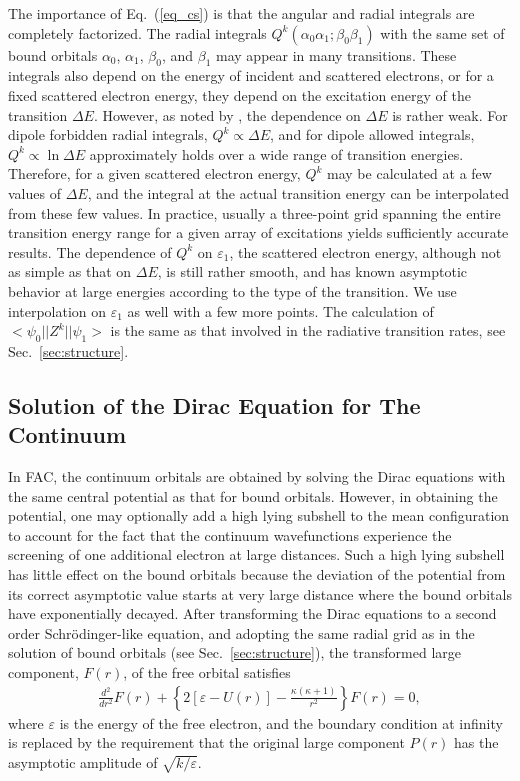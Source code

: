 The importance of Eq.~(\ref{eq_cs}) is that the angular and radial integrals
are completely factorized. The radial integrals
$Q^k(\alpha_0\alpha_1;\beta_0\beta_1)$ with the same set of bound orbitals
$\alpha_0$, $\alpha_1$, $\beta_0$, and $\beta_1$ may appear in many
transitions. These integrals also depend on the energy of incident
and scattered electrons, or for a fixed scattered electron energy, they depend
on the excitation energy of the transition $\Delta E$. However, as noted by
\citet{barshalom:1988a}, the dependence on $\Delta E$  is rather weak. For
dipole forbidden radial integrals, $Q^k \propto \Delta E$, and for dipole
allowed integrals, $Q^k \propto \ln\Delta E$ approximately holds over a wide
range of transition energies. Therefore, for a given scattered electron energy,
$Q^k$ may be calculated at a few values of $\Delta E$, and the integral at the
actual transition energy can be interpolated from these few values. In
practice, 
usually a three-point grid spanning the entire transition energy range for
a given array of excitations yields sufficiently accurate results. The
dependence of $Q^k$ on $\varepsilon_1$, the scattered electron energy,
although not as simple as that on $\Delta E$, is still rather smooth, and has
known asymptotic behavior at large energies according to the type of the
transition. We use interpolation on $\varepsilon_1$ as well with a few more
points. The calculation of $<\psi_0||Z^k||\psi_1>$ is the same as that
involved in the radiative transition rates, see Sec.~\ref{sec:structure}.

\subsection{Solution of the Dirac Equation for The Continuum}
In FAC, the continuum orbitals are obtained by solving the Dirac equations with
the same central potential as that for bound orbitals. However, in obtaining the
potential, one may optionally add a high lying subshell to the mean
configuration to account for the fact that the continuum  wavefunctions
experience the screening of one additional electron at large distances. Such a
high  lying subshell has little effect on the bound orbitals because the
deviation of the potential from its correct asymptotic value starts at very
large distance where the bound orbitals have exponentially decayed.  After
transforming the Dirac equations to a second order Schr\"{o}dinger-like
equation, and adopting the same radial grid as in the solution of bound orbitals
(see Sec.~\ref{sec:structure}), the transformed large component, $F(r)$,  of the
free orbital satisfies 
\begin{eqnarray}
\label{eq_schrodinger2}
\frac{d^2}{d r^2}F(r) + \left\{2\left[\varepsilon-U(r)\right] - 
\frac{\kappa(\kappa + 1)}{r^2}\right\}F(r) = 0,
\end{eqnarray}
where $\varepsilon$ is the energy of the free electron, and the boundary
condition at infinity is replaced by the requirement that the
original large component $P(r)$  has the asymptotic amplitude of
$\sqrt{k/\varepsilon}$.  


